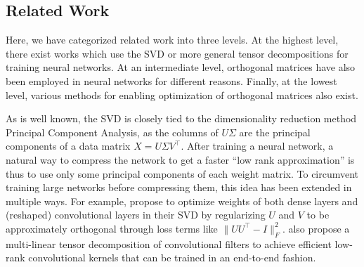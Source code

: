 \documentclass[11pt,a4paper,twoside,openright,final]{memoir}
\begin{document}
\subsection{Related Work}
Here, we have categorized related work into three levels.
At the highest level, there exist works which use the SVD or more general tensor decompositions for training neural networks.
At an intermediate level, orthogonal matrices have also been employed in neural networks for different reasons.
Finally, at the lowest level, various methods for enabling optimization of orthogonal matrices also exist.

As is well known, the SVD is closely tied to the dimensionality reduction method Principal Component Analysis, as the columns of $U\Sigma$ are the principal components of a data matrix $X = U \Sigma V^\intercal$.
After training a neural network, a natural way to compress the network to get a faster ``low rank approximation'' is thus to use only some principal components of each weight matrix.
To circumvent training large networks before compressing them, this idea has been extended in multiple ways.
For example, \citet{training-svd-regularized} propose to optimize weights of both dense layers and (reshaped) convolutional layers in their SVD by regularizing $U$ and $V$ to be approximately orthogonal through loss terms like $\|UU^\intercal-I\|_F^2$.
\citet{convolution-tensor-decomposition} also propose a multi-linear tensor decomposition of convolutional filters to achieve efficient low-rank convolutional kernels that can be trained in an end-to-end fashion.
\end{document}

